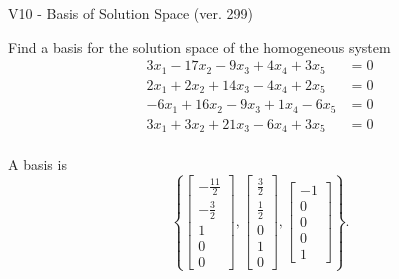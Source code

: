 \begin{exercise}
  \begin{exerciseTitle}V10 - Basis of Solution Space (ver. 299)\end{exerciseTitle}
  \begin{exerciseStatement}
    Find a basis for the solution space of the homogeneous system 
\begin{align*}
 3 x_ 1 -17 x_ 2 -9 x_ 3 + 4 x_ 4 + 3 x_ 5 &= 0  \\ 
  2 x_ 1 + 2 x_ 2 + 14 x_ 3 -4 x_ 4 + 2 x_ 5 &= 0  \\ 
  -6 x_ 1 + 16 x_ 2 -9 x_ 3 + 1 x_ 4 -6 x_ 5 &= 0  \\ 
  3 x_ 1 + 3 x_ 2 + 21 x_ 3 -6 x_ 4 + 3 x_ 5 &= 0  \\ 
 \end{align*}


 
  \end{exerciseStatement}

  \begin{exerciseAnswer}
   A basis is   
\[\left\{\left[\begin{array}{c}
-\frac{11}{2} \\
-\frac{3}{2} \\
1 \\
0 \\
0
\end{array}\right] , \left[\begin{array}{c}
\frac{3}{2} \\
\frac{1}{2} \\
0 \\
1 \\
0
\end{array}\right] , \left[\begin{array}{c}
-1 \\
0 \\
0 \\
0 \\
1
\end{array}\right]\right\}.\]

  


  \end{exerciseAnswer}
\end{exercise}